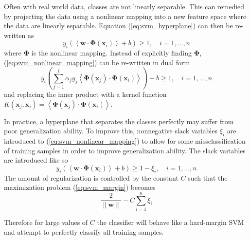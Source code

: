 Often with real world data, classes are not linearly separable. This can
remedied by projecting the data using a nonlinear mapping into a new feature
space where the data are linearly separable. Equation (\ref{eq:svm_hyperplane})
can then be re-written as
\begin{equation}\label{eq:svm_nonlinear_mapping}
y_i\left( \left< \mathbf{w} \cdot \boldsymbol{\Phi}(\mathbf{x}_i) \right> + b \right) \ge 1, \hspace{1em}
i = 1,\ldots,n
\end{equation}
where $\boldsymbol{\Phi}$ is the nonlinear mapping. Instead of explicitly
finding $\boldsymbol{\Phi}$, (\ref{eq:svm_nonlinear_mapping}) can be re-written
in dual form
\begin{equation}
y_i\left(
  \sum_{j=1}^{l} \alpha_j y_j \left<
  \boldsymbol{\Phi}(\mathbf{x}_j) \cdot \boldsymbol{\Phi}(\mathbf{x}_i)
  \right>
\right) + b \ge 1, \hspace{1em} i=1,\ldots,n
\end{equation}
and replacing the inner product with a kernel function
$K(\mathbf{x}_j,\mathbf{x}_i) = \left< \boldsymbol{\Phi}(\mathbf{x}_j) \cdot
\boldsymbol{\Phi}(\mathbf{x}_i) \right>$.

In practice, a hyperplane that separates the classes perfectly may suffer from
poor generalization ability. To improve this, nonnegative slack variables
$\xi_i$ are introduced to (\ref{eq:svm_nonlinear_mapping}) to allow for some
missclassification of training samples in order to improve generalization
ability. The slack variables are introduced like so
\begin{equation}\label{eq:svm_nonlinear_mapping_slack}
y_i\left( \left< \mathbf{w} \cdot \boldsymbol{\Phi}(\mathbf{x}_i) \right> + b
\right) \ge 1 - \xi_i, \hspace{1em}
i = 1,\ldots,n
\end{equation}
The amount of regularization is controlled by the constant $C$ such that the
maximization problem (\ref{eq:svm_margin}) becomes
\begin{equation}
\frac{2}{\|\mathbf{w}\|} - C \sum_{i=1}^{n} \xi_i
\end{equation}

Therefore for large values of $C$ the classifier will behave like a hard-margin
SVM and attempt to perfectly classify all training samples.

